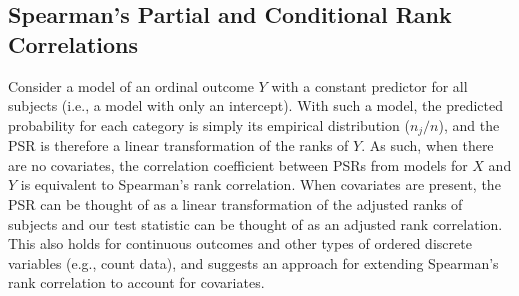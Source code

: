 \documentclass[12pt, usenatbib]{article}
\begin{document}

\subsection{Spearman's Partial and Conditional Rank Correlations}

Consider a model of an ordinal outcome $Y$ with a constant predictor for all subjects (i.e., a model with only an intercept).  With such a model, the predicted probability for each category is simply its empirical distribution ($n_j/n$), and the PSR is therefore a linear transformation of the ranks of $Y$.  As such, when there are no covariates, the correlation coefficient between PSRs from models for $X$ and $Y$ is equivalent to Spearman's rank correlation.  When covariates are present, the PSR can be thought of as a linear transformation of the adjusted ranks of subjects and our test statistic can be thought of as an adjusted rank correlation.  This also holds for continuous outcomes and other types of ordered discrete variables (e.g., count data), and suggests an approach for extending Spearman's rank correlation to account for covariates.  
\end{document}
